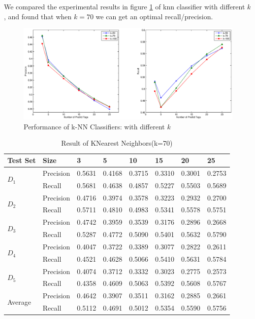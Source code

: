 We compared the experimental results in figure \ref{fig:knn} of knn classifier with different $k$, and found that when $k=70$ we can get an optimal recall/precision.

\begin{figure}[htb!]
\centering%
    \includegraphics[scale=0.40]{pic/knn}
\caption{Performance of k-NN Classifiers: with different $k$}
\label{fig:knn}

\end{figure}
\begin{table}
\centering \caption{\label{tb:nbresult}Result of KNearest Neighbors(k=70)}
\begin{tabular}{l|l|l|l|l|l|l|l}
	\hline Test Set & Size & 3 & 5 & 10 & 15 & 20 & 25 \\
	\hline \multirow{2}{*}{$D_1$} & Precision & 0.5631 & 0.4168 & 0.3715 & 0.3310 & 0.3001 & 0.2753\\
	\cline{2-8} & Recall & 0.5681 & 0.4638 & 0.4857 & 0.5227 & 0.5503 & 0.5689\\
	
	\hline \multirow{2}{*}{$D_2$} & Precision & 0.4716 & 0.3974 & 0.3578 & 0.3223 & 0.2932 & 0.2700\\
	\cline{2-8} & Recall & 0.5711 & 0.4810 & 0.4983 & 0.5341 & 0.5578 & 0.5751\\
	
	\hline \multirow{2}{*}{$D_3$} & Precision & 0.4742 & 0.3959 & 0.3539 & 0.3176 & 0.2896 & 0.2668 \\
	\cline{2-8} & Recall &0.5287 & 0.4772 & 0.5090 & 0.5401 & 0.5632 & 0.5790\\
	
	\hline \multirow{2}{*}{$D_4$} & Precision &0.4047 & 0.3722 & 0.3389 & 0.3077 & 0.2822 & 0.2611\\
	\cline{2-8} & Recall &0.4521 & 0.4628 & 0.5066 & 0.5410 & 0.5631 & 0.5784 \\
	
	\hline \multirow{2}{*}{$D_5$} & Precision &0.4074 & 0.3712 & 0.3332 & 0.3023 & 0.2775 & 0.2573 \\
	\cline{2-8} & Recall & 0.4358 & 0.4609 & 0.5063 & 0.5392 & 0.5608 & 0.5767\\
	
	\hline \multirow{2}{*}{Average} & Precision & 0.4642 & 0.3907 & 0.3511 & 0.3162 & 0.2885 & 0.2661\\
	\cline{2-8} & Recall &0.5112 & 0.4691 & 0.5012 & 0.5354 & 0.5590 & 0.5756\\
	
	\hline
\end{tabular}
\end{table}

